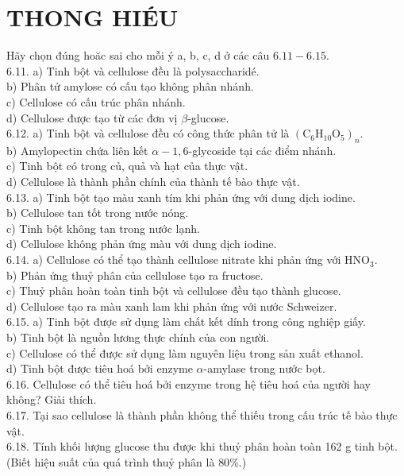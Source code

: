 \documentclass[10pt]{article}
\begin{document}
\section*{THONG HIÉU}
Hãy chọn đúng hoăc sai cho mỗi ý a, b, c, d ở các câu $6.11-6.15$.\\
6.11. a) Tinh bột và cellulose đều là polysaccharidé.\\
b) Phân tử amylose có cấu tạo không phân nhánh.\\
c) Cellulose có cấu trúc phân nhánh.\\
d) Cellulose được tạo từ các đơn vị $\beta$-glucose.\\
6.12. a) Tinh bột và cellulose đều có công thức phân tử là $\left(\mathrm{C}_{6} \mathrm{H}_{10} \mathrm{O}_{5}\right)_{n}$.\\
b) Amylopectin chứa liên kết $\alpha-1,6$-glycoside tại các điểm nhánh.\\
c) Tinh bột có trong củ, quả và hạt của thực vật.\\
d) Cellulose là thành phần chính của thành tế bào thực vật.\\
6.13. a) Tinh bột tạo màu xanh tím khi phản ứng với dung dịch iodine.\\
b) Cellulose tan tốt trong nước nóng.\\
c) Tinh bột không tan trong nước lạnh.\\
d) Cellulose không phản ứng màu với dung dịch iodine.\\
6.14. a) Cellulose có thể tạo thành cellulose nitrate khi phản ứng với $\mathrm{HNO}_{3}$.\\
b) Phản ứng thuỷ phân của cellulose tạo ra fructose.\\
c) Thuỷ phân hoàn toàn tinh bột và cellulose đều tạo thành glucose.\\
d) Cellulose tạo ra màu xanh lam khi phản ứng với nước Schweizer.\\
6.15. a) Tinh bột được sử dụng làm chất kết dính trong công nghiệp giấy.\\
b) Tinh bột là nguồn lương thực chính của con người.\\
c) Cellulose có thể được sử dụng làm nguyên liệu trong sản xuất ethanol.\\
d) Tinh bột được tiêu hoá bởi enzyme $\alpha$-amylase trong nước bọt.\\
6.16. Cellulose có thể tiêu hoá bởi enzyme trong hệ tiêu hoá của người hay không? Giải thích.\\
6.17. Tại sao cellulose là thành phần không thể thiếu trong cấu trúc tế bào thực vật.\\
6.18. Tính khối lượng glucose thu được khi thuỷ phân hoàn toàn 162 g tinh bột. (Biết hiệu suất của quá trình thuỷ phân là $80 \%$.)
\end{document}
